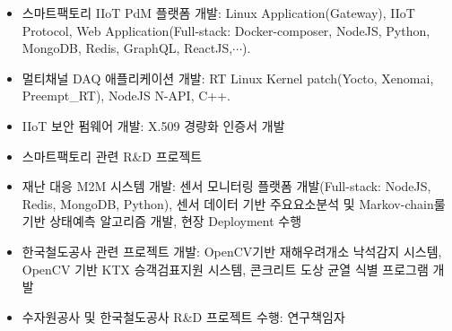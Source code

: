 \documentclass[10pt,a4paper,ragged2e]{altacv}
\begin{document}

\begin{fullwidth}
\makecvheader
\end{fullwidth}



\begin{itemize}
\item 스마트팩토리 IIoT PdM 플랫폼 개발: Linux Application(Gateway), IIoT Protocol, Web Application(Full-stack: Docker-composer, NodeJS, Python, MongoDB, Redis, GraphQL, ReactJS,$\cdots$).
\item 멀티채널 DAQ 애플리케이션 개발: RT Linux Kernel patch(Yocto, Xenomai, Preempt\_RT), NodeJS N-API, C++.
\item IIoT 보안 펌웨어 개발: X.509 경량화 인증서 개발 
\item 스마트팩토리 관련 R\&D 프로젝트
\end{itemize}

\divider

\begin{itemize}
\item 재난 대응 M2M 시스템 개발: 센서 모니터링 플랫폼 개발(Full-stack: NodeJS, Redis, MongoDB, Python), 센서 데이터 기반 주요요소분석 및 Markov-chain룰 기반 상태예측 알고리즘 개발, 현장 Deployment 수행
\item 한국철도공사 관련 프로젝트 개발: OpenCV기반 재해우려개소 낙석감지 시스템, OpenCV 기반 KTX 승객검표지원 시스템, 콘크리트 도상 균열 식별 프로그램 개발
\item 수자원공사 및 한국철도공사 R\&D 프로젝트 수행: 연구책임자
\end{itemize}
\end{document}
